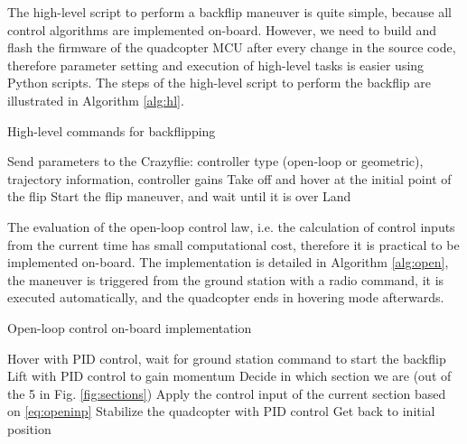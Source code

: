 The high-level script to perform a backflip maneuver is quite simple, because all control algorithms are implemented on-board. However, we need to build and flash the firmware of the quadcopter MCU after every change in the source code, therefore parameter setting and execution of high-level tasks is easier using Python scripts. The steps of the high-level script to perform the backflip are illustrated in Algorithm \ref{alg:hl}.

\begin{algorithm}
  \caption{High-level commands for backflipping}
  \label{alg:hl}
  \begin{algorithmic}[1]
    \State Send parameters to the Crazyflie: controller type (open-loop or geometric), trajectory information, controller gains
    \State Take off and hover at the initial point of the flip
    \State Start the flip maneuver, and wait until it is over
    \State Land
  \end{algorithmic}
  \end{algorithm}

The evaluation of the open-loop control law, i.e. the calculation of control inputs from the current time has small computational cost, therefore it is practical to be implemented on-board. The implementation is detailed in Algorithm \ref{alg:open}, the maneuver is triggered from the ground station with a radio command, it is executed automatically, and the quadcopter ends in hovering mode afterwards.
\begin{algorithm}
  \caption{Open-loop control on-board implementation}
  \label{alg:open}
  \begin{algorithmic}[1]
    \State Hover with PID control, wait for ground station command to start the backflip
    \State Lift with PID control to gain momentum
      \State Decide in which section we are (out of the 5 in Fig. \ref{fig:sections})
      \State Apply the control input of the current section based on \eqref{eq:openinp}
    \EndWhile
    \State Stabilize the quadcopter with PID control
    \State Get back to initial position
  \end{algorithmic}
  \end{algorithm}

